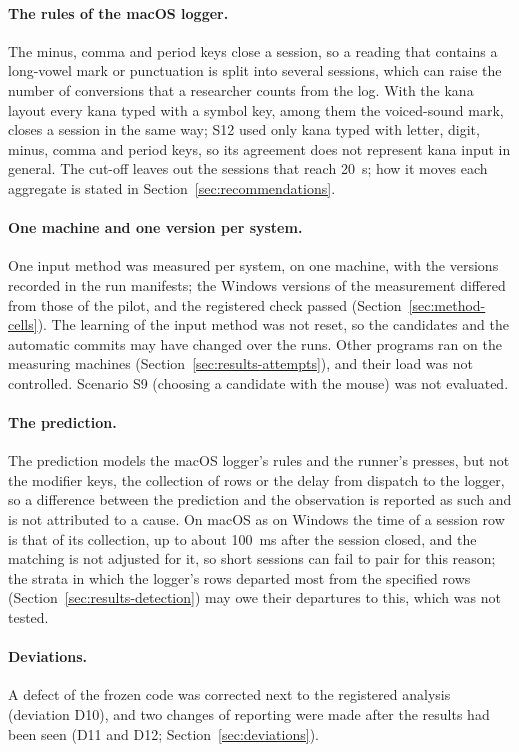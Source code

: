 \paragraph{The rules of the macOS logger.} The minus, comma and period keys close a session, so a reading that contains
a long-vowel mark or punctuation is split into several sessions, which can raise the number of conversions that a
researcher counts from the log. With the kana layout every kana typed with a symbol key, among them the voiced-sound
mark, closes a session in the same way; S12 used only kana typed with letter, digit, minus, comma and period keys, so
its agreement does not represent kana input in general. The cut-off leaves out
the sessions that reach 20~s; how it moves each aggregate is stated in Section~\ref{sec:recommendations}.

\paragraph{One machine and one version per system.} One input method was measured per system, on one machine, with the
versions recorded in the run manifests; the Windows versions of the measurement differed from those of the pilot, and
the registered check passed (Section~\ref{sec:method-cells}). The learning of the input method was not reset, so the
candidates and the automatic commits may have changed over the runs. Other programs ran on the measuring machines
(Section~\ref{sec:results-attempts}), and their load was not controlled. Scenario S9 (choosing a candidate with the
mouse) was not evaluated.

\paragraph{The prediction.} The prediction models the macOS logger's rules and the runner's presses, but not the
modifier keys, the collection of rows or the delay from dispatch to the logger, so a difference between the prediction
and the observation is reported as such and is not attributed to a cause. On macOS as on Windows the time of a session
row is that of its collection, up to about 100~ms after the session closed, and the matching is not adjusted for it, so
short sessions can fail to pair for this reason; the strata in which the logger's rows departed most from the specified
rows (Section~\ref{sec:results-detection}) may owe their departures to this, which was not tested.

\paragraph{Deviations.} A defect of the frozen code was corrected next to the registered analysis (deviation D10), and
two changes of reporting were made after the results had been seen (D11 and D12; Section~\ref{sec:deviations}).

